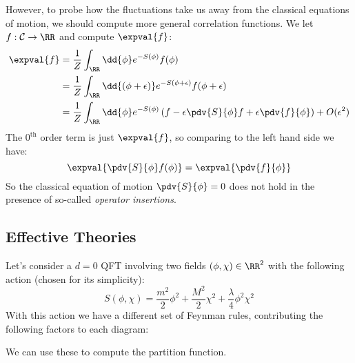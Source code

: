 \documentclass{jknotes}
\begin{document}
However, to probe how the fluctuations take us away from the classical equations of motion, we should compute more general correlation functions. We let \(f:\mathcal{C}\rightarrow\RR\) and compute \(\expval{f}\):
\begin{align}
    \expval{f} &= \frac{1}{Z}\int_\RR\dd{\phi}e^{-S(\phi)}f(\phi) \\
    &= \frac{1}{Z} \int_\RR\dd{(\phi+\epsilon)} e^{-S(\phi+\epsilon)}f(\phi+\epsilon) \\
    &= \frac{1}{Z} \int_\RR \dd{\phi} e^{-S(\phi)} \left( f-\epsilon\pdv{S}{\phi}f + \epsilon\pdv{f}{\phi} \right) + O(\epsilon^2)
\end{align}
The \(0^\text{th}\) order term is just \(\expval{f}\), so comparing to the left hand side we have:
\begin{equation}
    \expval{\pdv{S}{\phi}f(\phi)} = \expval{\pdv{f}{\phi}}
\end{equation}
So the classical equation of motion \(\pdv{S}{\phi}=0\) does not hold in the presence of so-called \emph{operator insertions}.

\subsection{Effective Theories}
Let's consider a \(d=0\) QFT involving two fields \((\phi,\chi)\in\RR^2\) with the following action (chosen for its simplicity):
\begin{equation}
    S(\phi,\chi) = \frac{m^2}{2}\phi^2 + \frac{M^2}{2}\chi^2 + \frac{\lambda}{4}\phi^2\chi^2
\end{equation}
With this action we have a different set of Feynman rules, contributing the following factors to each diagram:
\begin{figure}[H]
    \centering
\end{figure}
We can use these to compute the partition function.
\end{document}
